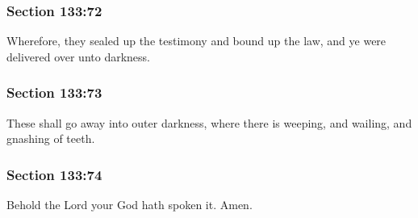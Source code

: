 	\subsubsection{Section 133:72} %
		\label{DC133-72}

		Wherefore, they sealed up the testimony and bound up the law, and ye were delivered over unto darkness.


	\subsubsection{Section 133:73} %
		\label{DC133-73}

		These shall go away into outer darkness, where there is weeping, and wailing, and gnashing of teeth.


	\subsubsection{Section 133:74} %
		\label{DC133-74}

		Behold the Lord your God hath spoken it.  Amen.

